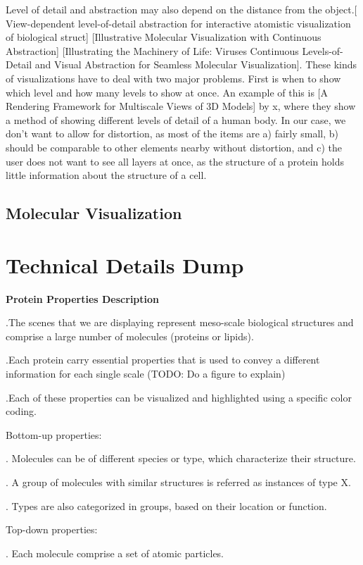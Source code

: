 \documentclass[review,journal]{vgtc}         %
\begin{document}
Level of detail and abstraction may also depend on the distance from the object.[ View-dependent level-of-detail abstraction for interactive atomistic visualization of biological struct] [Illustrative Molecular Visualization with Continuous Abstraction] [Illustrating the Machinery of Life: Viruses Continuous Levels-of-Detail and Visual Abstraction for Seamless Molecular Visualization]. 
These kinds of visualizations have to deal with two major problems. First is when to show which level and how many levels to show at once. An example of this is [A Rendering Framework for Multiscale Views of 3D Models] by x, where they show a method of showing different levels of detail of a human body. In our case, we don’t want to allow for distortion, as most of the items are a) fairly small, b) should be comparable to other elements nearby without distortion, and c) the user does not want to see all layers at once, as the structure of a protein holds little information about the structure of a cell.

\subsection{Molecular Visualization}

\section{Technical Details Dump}

\textbf{Protein Properties Description}

.The scenes that we are displaying represent meso-scale biological structures and comprise a large number of molecules (proteins or lipids).

.Each protein carry essential properties that is used to convey a different information for each single scale (TODO: Do a figure to explain)

.Each of these properties can be visualized and highlighted using a specific color coding.

Bottom-up properties:

. Molecules can be of different species or type, which characterize their structure.

. A group of molecules with similar structures is referred as instances of type X.

. Types are also categorized in groups, based on their location or function. 


Top-down properties:

. Each molecule comprise a set of atomic particles.
\end{document}
